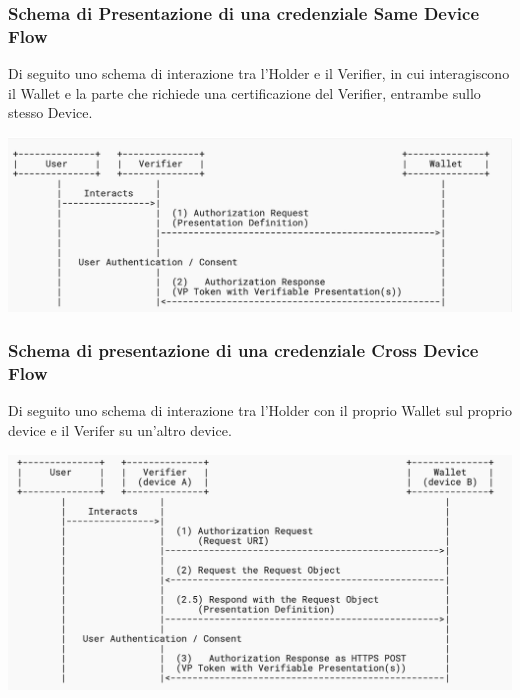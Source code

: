 \subsubsection{Schema di Presentazione di una credenziale Same Device Flow}
Di seguito uno schema di interazione tra l'Holder e il Verifier, in cui interagiscono il Wallet e la parte che richiede una
certificazione del Verifier, entrambe sullo stesso Device.
\begin{center}
	\includegraphics[scale = 0.3]{./res/images/PresentationSameDevice.jpg}
\end{center}

\subsubsection{Schema di presentazione di una credenziale Cross Device Flow}
Di seguito uno schema di interazione tra l'Holder con il proprio Wallet sul proprio device e il Verifer su un'altro device.\\

\begin{center}
	\includegraphics[scale = 0.3]{./res/images/PresentationCrossDevice.jpg}
\end{center}

